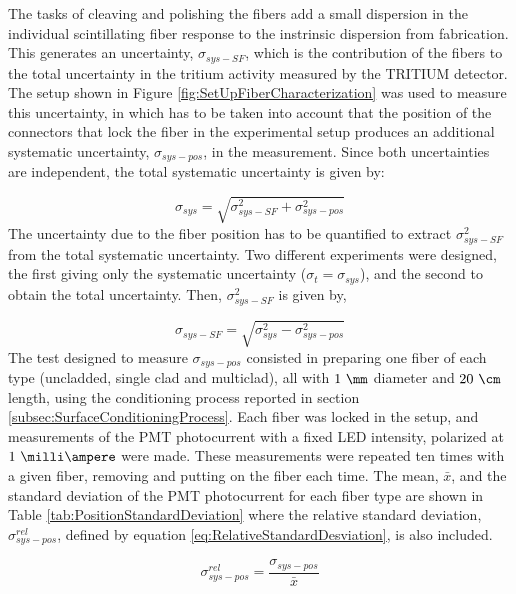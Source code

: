 The tasks of cleaving and polishing the fibers add a small dispersion in the individual scintillating fiber response to the instrinsic dispersion from fabrication. This generates an uncertainty, $\sigma_{sys-SF}$, which is the contribution of the fibers to the total uncertainty in the tritium activity measured by the TRITIUM detector. The setup shown in Figure \ref{fig:SetUpFiberCharacterization} was used to measure this uncertainty, in which has to be taken into account that the position of the connectors that lock the fiber in the experimental setup produces an additional systematic uncertainty, $\sigma_{sys-pos}$, in the measurement. Since both uncertainties are independent, the total systematic uncertainty is given by:

\begin{equation}
\sigma_{sys} = \sqrt{\sigma^2_{sys-SF} + \sigma^2_{sys-pos} }
\label{eq:TotalUncertaintyFiberCharacterization}
\end{equation}
The uncertainty due to the fiber position has to be quantified to extract $\sigma^2_{sys-SF}$ from the total systematic uncertainty. Two different experiments were designed, the first giving only the systematic uncertainty ($\sigma_{t} = \sigma_{sys}$), and the second to obtain the total uncertainty. Then, $\sigma^2_{sys-SF}$ is given by,

\begin{equation}
\sigma_{sys-SF} = \sqrt{\sigma^2_{sys} - \sigma^2_{sys-pos} }
\label{eq:TMUncertaintyFiberCharacterization}
\end{equation}
The test designed to measure $\sigma_{sys-pos}$ consisted in preparing one fiber of each type (uncladded, single clad and multiclad), all with $1~\mm$ diameter and $20~\cm$ length, using the conditioning process reported in section \ref{subsec:SurfaceConditioningProcess}. Each fiber was locked in the setup, and measurements of the PMT photocurrent with a fixed LED intensity, polarized at $1~\milli\ampere$ were made. These measurements were repeated ten times with a given fiber, removing and putting on the fiber each time. The mean, $\bar{x}$, and the standard deviation of the PMT photocurrent for each fiber type are shown in Table \ref{tab:PositionStandardDeviation} where the relative standard deviation, $\sigma^{rel}_{sys-pos}$, defined by equation \ref{eq:RelativeStandardDesviation}, is also included.

\begin{equation}
\sigma^{rel}_{sys-pos} = \frac{\sigma_{sys-pos}}{\bar{x}}
\label{eq:RelativeStandardDesviation}
\end{equation}

